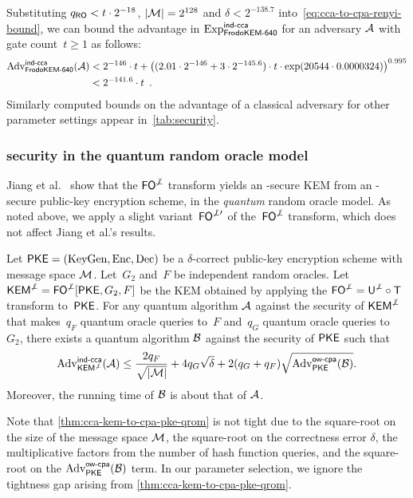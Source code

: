 \documentclass{iacrcc}
\begin{document}
Substituting $q_{\mathsf{RO}} < t\cdot 2^{-18}$, $|\mathcal{M}|=2^{128}$ and
$\delta<2^{-138.7}$ into~\eqref{eq:cca-to-cpa-renyi-bound}, we can
bound the advantage in $\mathrm{Exp}^{\textsf{\upshape\mdseries \textsf{\upshape\mdseries ind-cca}}}_{\textsf{\upshape\mdseries FrodoKEM-640}}$ for an adversary
$\mathcal{A}$ with gate count~$t \geq 1$ as follows:
\begin{align*}
  \mathrm{Adv}^{\textsf{\upshape\mdseries \textsf{\upshape\mdseries ind-cca}}}_{\textsf{\upshape\mdseries FrodoKEM-640}}(\mathcal{A})
  &< 2^{-146} \cdot t + \left((2.01 \cdot 2^{-146} + 3 \cdot
    2^{-145.6}) \cdot t \cdot \exp(20544\cdot 0.0000324)\right)^{0.995} \\
  &< 2^{-141.6} \cdot t \enspace .
\end{align*}
Similarly computed bounds on the advantage of a classical \INDCCA
adversary for other parameter settings appear
in~\autoref{tab:security}.

\subsubsection{\INDCCA security in the quantum random oracle model}
\label{sec:strength:cca-kem-qrom}

Jiang et al.~\cite{C:JZCWM18} show that the $\textsf{\upshape\mdseries FO}^{\not\perp}$ transform
yields an \INDCCA-secure KEM from an \OWCPA-secure public-key
encryption scheme, in the \emph{quantum} random oracle model.  As
noted above, we apply a slight variant~$\textsf{\upshape\mdseries FO}^{\not\perp\prime}$ of
the~$\textsf{\upshape\mdseries FO}^{\not\perp}$ transform, which does not affect Jiang et al.'s
results.

\begin{theorem}
  \label{thm:cca-kem-to-cpa-pke-qrom}
  Let $\textsf{\upshape\mdseries PKE} = (\textrm{\upshape\mdseries KeyGen},\textrm{\upshape\mdseries Enc},\textrm{\upshape\mdseries Dec})$ be a $\delta$-correct public-key
  encryption scheme with message space $\mathcal{M}$.  Let~$G_2$ and~$F$ be
  independent random oracles.  Let
  $\textsf{\upshape\mdseries KEM}^{\not\perp}=\textsf{\upshape\mdseries FO}^{\not\perp}[\textsf{\upshape\mdseries PKE},G_2,F]$ be the KEM obtained by applying
  the $\textsf{\upshape\mdseries FO}^{\not\perp}=\textsf{\upshape\mdseries U}^{\not\perp} \circ \textsf{\upshape\mdseries T}$ transform to~$\textsf{\upshape\mdseries PKE}$.  For any
  quantum algorithm $\mathcal{A}$ against the \INDCCA security of
  $\textsf{\upshape\mdseries KEM}^{\not\perp}$ that makes~$q_F$ quantum oracle queries to~$F$
  and~$q_G$ quantum oracle queries to~$G_2$, there exists a quantum
  algorithm $\mathcal{B}$ against the \OWCPA security of $\textsf{\upshape\mdseries PKE}$ such
  that
  \[ \mathrm{Adv}^{\textsf{\upshape\mdseries \textsf{\upshape\mdseries ind-cca}}}_{\textsf{\upshape\mdseries KEM}^{\not\perp}}(\mathcal{A}) \leq
    \frac{2 q_F}{\sqrt{|\mathcal{M}|}} + 4 q_G \sqrt{\delta} + 2(q_G + q_F)
    \sqrt{\mathrm{Adv}^{\textsf{\upshape\mdseries \textsf{\upshape\mdseries ow-cpa}}}_{\textsf{\upshape\mdseries PKE}}(\mathcal{B})}.\] Moreover, the running
  time of $\mathcal{B}$ is about that of $\mathcal{A}$.
\end{theorem}

Note that \autoref{thm:cca-kem-to-cpa-pke-qrom} is not tight due to
the square-root on the size of the message space $\mathcal{M}$, the
square-root on the correctness error $\delta$, the multiplicative
factors from the number of hash function queries, and the square-root
on the $\mathrm{Adv}^{\textsf{\upshape\mdseries \textsf{\upshape\mdseries ow-cpa}}}_{\textsf{\upshape\mdseries PKE}}(\mathcal{B})$ term.  In our parameter
selection, we ignore the tightness gap arising from
\autoref{thm:cca-kem-to-cpa-pke-qrom}.
\end{document}
